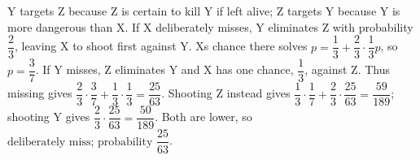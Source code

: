 Y targets Z because Z is certain to kill Y if left alive; Z targets Y because Y is more dangerous than X. If X deliberately misses, Y eliminates Z with probability $\dfrac{2}{3}$, leaving X to shoot first against Y. X\textquotesingle s chance there solves $p=\dfrac{1}{3}+\dfrac{2}{3}\cdot\dfrac{1}{3} p$, so $p=\dfrac{3}{7}$. If Y misses, Z eliminates Y and X has one chance, $\dfrac{1}{3}$, against Z. Thus missing gives $\dfrac{2}{3}\cdot\dfrac{3}{7}+\dfrac{1}{3}\cdot\dfrac{1}{3}=\dfrac{25}{63}$. Shooting Z instead gives $\dfrac{1}{3}\cdot\dfrac{1}{7}+\dfrac{2}{3}\cdot\dfrac{25}{63}=\dfrac{59}{189}$; shooting Y gives $\dfrac{2}{3}\cdot\dfrac{25}{63}=\dfrac{50}{189}$. Both are lower, so $\boxed{\text{deliberately miss; probability }\dfrac{25}{63}}$.

